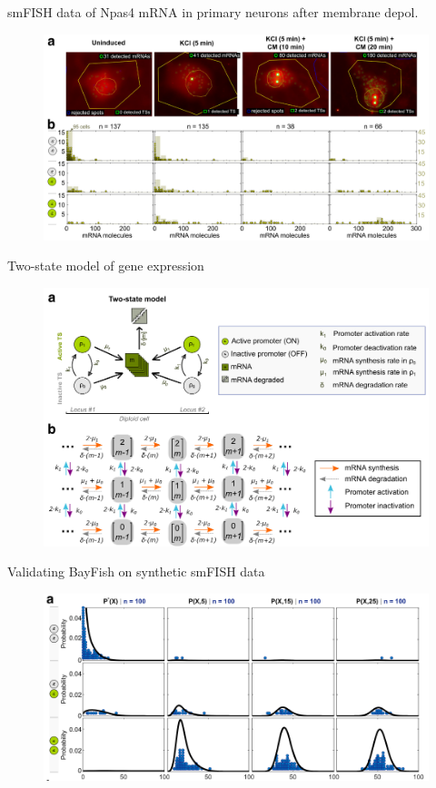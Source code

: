 \documentclass[aspectratio=1610]{beamer}					%
\begin{document}
\begin{frame}{smFISH data of Npas4 mRNA in primary neurons after membrane depol.}

\begin{figure}
\includegraphics[width=14cm]{figure-1.png}
\end{figure}

\end{frame}

\begin{frame}{Two-state model of gene expression}

\begin{figure}
\includegraphics[width=12cm]{figure-2.png}
\end{figure}

\end{frame}

\begin{frame}{Validating BayFish on synthetic smFISH data}

\begin{figure}
\includegraphics[width=14cm]{figure-3a.png}
\end{figure}

\end{frame}
\end{document}
